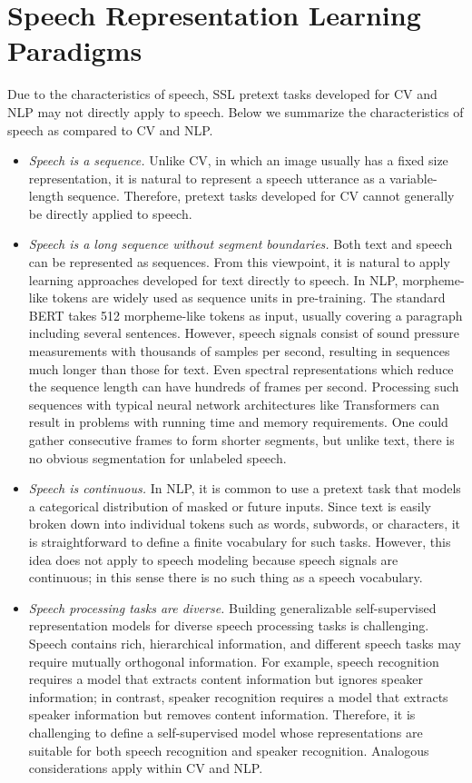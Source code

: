 
\section{Speech Representation Learning Paradigms} \label{sec:approach}
Due to the characteristics of speech, SSL pretext tasks developed for CV
and NLP may not directly apply to speech.
Below we summarize the characteristics of speech as compared to CV and NLP.
\begin{itemize}
\item \textit{Speech is a sequence.} 
Unlike CV, in which an image usually has a fixed size representation, it is
natural to represent a speech utterance as a variable-length sequence. 
Therefore, pretext tasks developed for CV cannot generally be directly
applied to speech.

\item \textit{Speech is a long sequence without segment boundaries.} 
Both text and speech can be represented as sequences. From this viewpoint, it
is natural to apply learning approaches developed for text directly to
speech. 
In NLP, morpheme-like tokens are widely used as sequence units in
pre-training. The standard BERT takes 512 morpheme-like tokens as
input, usually covering a paragraph including several sentences. 
However, speech signals consist of sound pressure measurements with thousands
of samples per second, resulting in sequences much longer than those for text. Even
spectral representations which reduce the sequence length can have hundreds of
frames per second.
Processing such sequences with typical neural network architectures like
Transformers can result in problems with running time and memory requirements. 
One could gather consecutive frames to form shorter segments,
but unlike text, there is no obvious segmentation for unlabeled
speech.
\item \textit{Speech is continuous.} 
In NLP, it is common to use a pretext task that models a categorical
distribution of masked or future inputs. Since text is easily broken down into
individual tokens such as words, subwords, or characters, it is
straightforward to define a finite vocabulary for such tasks.
However, this idea does not apply to speech modeling because speech
signals are continuous; 
in this sense there is no such thing as a speech vocabulary. 
\item \textit{Speech processing tasks are diverse.}
Building generalizable self-supervised representation models for diverse speech
processing tasks is challenging.
Speech contains rich, hierarchical information, and different speech tasks
may require mutually orthogonal information.
For example, speech recognition requires a model that extracts content information
but ignores speaker information; in contrast, speaker recognition 
requires a model that extracts speaker information but removes content information.
Therefore, it is challenging to define a self-supervised model whose
representations are suitable for both speech recognition and speaker
recognition. Analogous considerations apply within CV and NLP.
\end{itemize}


